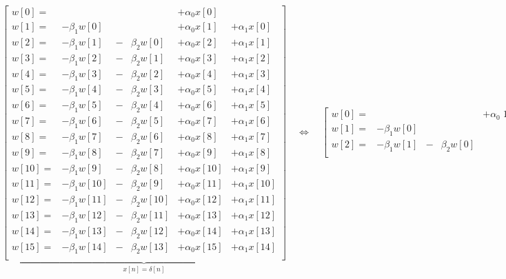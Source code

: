 \documentclass[10pt]{amsart}
\begin{document}
\[
\underbrace{
\begin{bmatrix}
  w[ 0] = &                 &  &                &  + \alpha_0 x[ 0] &                 \\
  w[ 1] = & - \beta_1 w[ 0] &  &                &  + \alpha_0 x[ 1] &+ \alpha_1 x[ 0] \\
  w[ 2] = & - \beta_1 w[ 1] &- & \beta_2 w[ 0]  &  + \alpha_0 x[ 2] &+ \alpha_1 x[ 1] \\
  w[ 3] = & - \beta_1 w[ 2] &- & \beta_2 w[ 1]  &  + \alpha_0 x[ 3] &+ \alpha_1 x[ 2] \\
  w[ 4] = & - \beta_1 w[ 3] &- & \beta_2 w[ 2]  &  + \alpha_0 x[ 4] &+ \alpha_1 x[ 3] \\
  w[ 5] = & - \beta_1 w[ 4] &- & \beta_2 w[ 3]  &  + \alpha_0 x[ 5] &+ \alpha_1 x[ 4] \\
  w[ 6] = & - \beta_1 w[ 5] &- & \beta_2 w[ 4]  &  + \alpha_0 x[ 6] &+ \alpha_1 x[ 5] \\
  w[ 7] = & - \beta_1 w[ 6] &- & \beta_2 w[ 5]  &  + \alpha_0 x[ 7] &+ \alpha_1 x[ 6] \\
  w[ 8] = & - \beta_1 w[ 7] &- & \beta_2 w[ 6]  &  + \alpha_0 x[ 8] &+ \alpha_1 x[ 7] \\
  w[ 9] = & - \beta_1 w[ 8] &- & \beta_2 w[ 7]  &  + \alpha_0 x[ 9] &+ \alpha_1 x[ 8] \\
  w[10] = & - \beta_1 w[ 9] &- & \beta_2 w[ 8]  &  + \alpha_0 x[10] &+ \alpha_1 x[ 9] \\
  w[11] = & - \beta_1 w[10] &- & \beta_2 w[ 9]  &  + \alpha_0 x[11] &+ \alpha_1 x[10] \\
  w[12] = & - \beta_1 w[11] &- & \beta_2 w[10]  &  + \alpha_0 x[12] &+ \alpha_1 x[11] \\
  w[13] = & - \beta_1 w[12] &- & \beta_2 w[11]  &  + \alpha_0 x[13] &+ \alpha_1 x[12] \\
  w[14] = & - \beta_1 w[13] &- & \beta_2 w[12]  &  + \alpha_0 x[14] &+ \alpha_1 x[13] \\
  w[15] = & - \beta_1 w[14] &- & \beta_2 w[13]  &  + \alpha_0 x[15] &+ \alpha_1 x[14] \\
\end{bmatrix}
}_{x[n] = \delta[n]}
\quad \Leftrightarrow \quad
\begin{bmatrix}
  w[ 0] = &                &  &                &  + \alpha_0 \; 1  &                 \\
  w[ 1] = &- \beta_1 w[ 0] &  &                &                   &+ \alpha_1 \; 1  \\
  w[ 2] = &- \beta_1 w[ 1] &- & \beta_2 w[ 0]  &                   &                 \\

\end{bmatrix}\]
\end{document}
